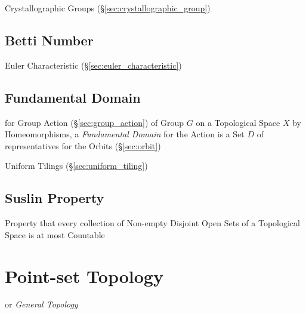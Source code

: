 Crystallographic Groups (\S\ref{sec:crystallographic_group})



\subsection{Betti Number}\label{sec:betti_number}

Euler Characteristic (\S\ref{sec:euler_characteristic})



\subsection{Fundamental Domain}\label{sec:fundamental_domain}

for Group Action (\S\ref{sec:group_action}) of Group $G$ on a Topological Space
$X$ by Homeomorphisms, a \emph{Fundamental Domain} for the Action is a Set $D$
of representatives for the Orbits (\S\ref{sec:orbit})

Uniform Tilings (\S\ref{sec:uniform_tiling})



\subsection{Suslin Property}\label{sec:suslin_property}

Property that every collection of Non-empty Disjoint Open Sets of a Topological
Space is at most Countable



\section{Point-set Topology}\label{sec:pointset_topology}

or \emph{General Topology}

